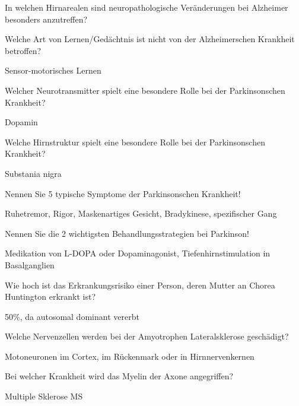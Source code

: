 \documentclass[10pt, a4paper]{exam}
\begin{document}
\begin{questions}
  \question In welchen Hirnarealen sind neuropathologische Veränderungen bei Alzheimer besonders anzutreffen?
  \begin{solution}

  \end{solution}

  \question Welche Art von Lernen/Gedächtnis ist nicht von der Alzheimerschen Krankheit betroffen?
  \begin{solution}
    Sensor-motorisches Lernen
  \end{solution}

  \question Welcher Neurotransmitter spielt eine besondere Rolle bei der Parkinsonschen Krankheit?
  \begin{solution}
    Dopamin
  \end{solution}

  \question Welche Hirnstruktur spielt eine besondere Rolle bei der Parkinsonschen Krankheit?
  \begin{solution}
    Substania nigra
  \end{solution}

  \question Nennen Sie 5 typische Symptome der Parkinsonschen Krankheit!
  \begin{solution}
    Ruhetremor, Rigor, Maskenartiges Gesicht, Bradykinese, spezifischer Gang
  \end{solution}

  \question Nennen Sie die 2 wichtigsten Behandlungsstrategien bei Parkinson!
  \begin{solution}
    Medikation von L-DOPA oder Dopaminagonist, Tiefenhirnstimulation in Basalganglien
  \end{solution}

  \question Wie hoch ist das Erkrankungsrisiko einer Person, deren Mutter an Chorea Huntington erkrankt ist?
  \begin{solution}
    50\%, da autosomal dominant vererbt
  \end{solution}

  \question Welche Nervenzellen werden bei der Amyotrophen Lateralsklerose geschädigt?
  \begin{solution}
    Motoneuronen im Cortex, im Rückenmark oder in Hirnnervenkernen
  \end{solution}

  \question Bei welcher Krankheit wird das Myelin der Axone angegriffen?
  \begin{solution}
    Multiple Sklerose MS
  \end{solution}


\end{questions}
\end{document}

